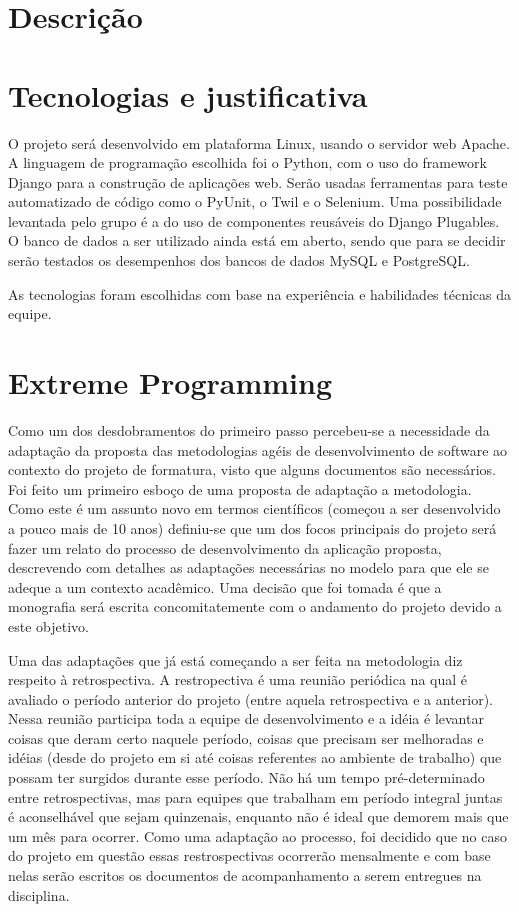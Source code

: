 \documentclass[a4paper,12pt,font=plain,header=plain]{abnt}
\begin{document}
  \section{Descrição}

  \section{Tecnologias e justificativa}
    O projeto será desenvolvido em plataforma Linux, usando o servidor web Apache. A linguagem de programação escolhida foi o Python, com o uso do framework Django para a construção de aplicações web. Serão usadas ferramentas para teste automatizado de código como o PyUnit, o Twil e o Selenium. Uma possibilidade levantada pelo grupo é a do uso de componentes reusáveis do Django Plugables. O banco de dados a ser utilizado ainda está em aberto, sendo que para se decidir serão testados os desempenhos dos bancos de dados MySQL e PostgreSQL.

    As tecnologias foram escolhidas com base na experiência e habilidades técnicas da equipe.

  \section{Extreme Programming}
	  Como um dos desdobramentos do primeiro passo percebeu-se a necessidade da adaptação da proposta das metodologias agéis de desenvolvimento de software ao contexto do projeto de formatura, visto que alguns documentos são necessários. Foi feito um primeiro esboço de uma proposta de adaptação a metodologia. Como este é um assunto novo em termos científicos (começou a ser desenvolvido a pouco mais de 10 anos) definiu-se que um dos focos principais do projeto será fazer um relato do processo de desenvolvimento da aplicação proposta, descrevendo com detalhes as adaptações necessárias no modelo para que ele se adeque a um contexto acadêmico. Uma decisão que foi tomada é que a monografia será escrita concomitatemente com o andamento do projeto devido a este objetivo.

    Uma das adaptações que já está começando a ser feita na metodologia diz respeito à retrospectiva. A restropectiva é uma reunião periódica na qual é avaliado o período anterior do projeto (entre aquela retrospectiva e a anterior). Nessa reunião participa toda a equipe de desenvolvimento e a idéia é levantar coisas que deram certo naquele período, coisas que precisam ser melhoradas e idéias (desde do projeto em si até coisas referentes ao ambiente de trabalho) que possam ter surgidos durante esse período. Não há um tempo pré-determinado entre retrospectivas, mas para equipes que trabalham em período integral juntas é aconselhável que sejam quinzenais, enquanto não é ideal que demorem mais que um mês para ocorrer. Como uma adaptação ao processo, foi decidido que no caso do projeto em questão essas restrospectivas ocorrerão mensalmente e com base nelas serão escritos os documentos de acompanhamento a serem entregues na disciplina.
\end{document}
